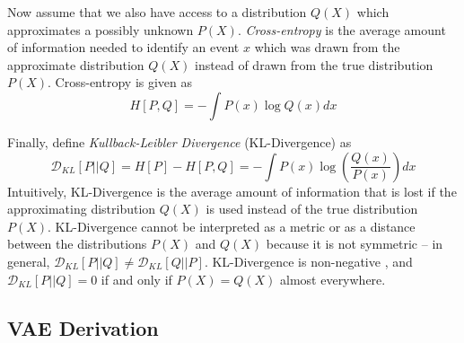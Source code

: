 Now assume that we also have access to a distribution $Q(X)$ which approximates a possibly unknown $P(X)$. \textit{Cross-entropy} is the average amount of information needed to identify an event $x$ which was drawn from the approximate distribution $Q(X)$ instead of drawn from the true distribution $P(X)$. Cross-entropy is given as
\begin{equation}
  H[P,Q] = - \int P(x) \log Q(x) dx
  \label{eq:xentropy}
\end{equation}

Finally, define \textit{Kullback-Leibler Divergence} (KL-Divergence) \cite{kullback1951} as 
\begin{equation}
  \mathcal{D}_{KL}\left[ P \big|\big| Q \right] = H[P] - H[P,Q] = - \int P(x) \log \left(\frac{Q(x)}{P(x)} \right)dx
  \label{eq:kl_div}
\end{equation}
Intuitively, KL-Divergence is the average amount of information that is lost if the approximating distribution $Q(X)$ is used instead of the true distribution $P(X)$. KL-Divergence cannot be interpreted as a metric or as a distance between the distributions $P(X)$ and $Q(X)$ because it is not symmetric -- in general, $\mathcal{D}_{KL}[P\big|\big|Q] \not = \mathcal{D}_{KL}[Q\big|\big|P]$. KL-Divergence is non-negative \cite{kingma2014}, and $\mathcal{D}_{KL}[P\big|\big|Q] = 0$ if and only if $P(X) = Q(X)$ almost everywhere.

\subsection{VAE Derivation}\label{sec:vae_derive}

